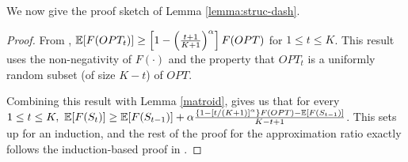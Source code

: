 \noindent We now give the proof sketch of Lemma \ref{lemma:struc-dash}.
\lemmastrucdash*
\begin{proof}
From \citet[Lemma 2.3]{pmlr-v80-chen18b}, $\mathbb{E}[F(OPT_t)]\geq \left[ 1-\left( \frac{t+1}{K+1}\right)^{\alpha}\right] F(OPT)$ for $1\leq t \leq K$. This result uses the non-negativity of $F(\cdot)$ and the property that $OPT_t$ is a uniformly random subset (of size $K-t$) of $OPT$.

Combining this result with Lemma \ref{matroid}, \citet[Corollary 2.5]{pmlr-v80-chen18b} gives us that for every $1\leq t\leq K, ~ \mathbb{E}[F(S_t)]\geq \mathbb{E}[F(S_{t-1})] + \alpha \frac{\{1-[t/(K+1)]^\alpha\}F(OPT)-\mathbb{E}[F(S_{t-1})]}{K-t+1}$. This sets up for an induction, and the rest of the proof for the approximation ratio exactly follows the induction-based proof in \citet[Theorem 2.6]{pmlr-v80-chen18b}.
\end{proof}

